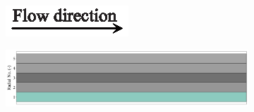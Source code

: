 \documentclass[preprint,12pt]{elsarticle}
\begin{document}
\begin{figure}[h!]
     \centering
     \begin{subfigure}[b]{\textwidth}
     	\includegraphics[width=\textwidth]{flow_dir.eps}
     \end{subfigure}
     \begin{subfigure}[b]{0.85\textwidth}
\includegraphics[width=\textwidth]{results/segments/5seg/50C50T/seg.png}
     \end{subfigure}
     \hfill
     \begin{subfigure}[b]{0.1\textwidth}

\end{subfigure}
\end{figure}
\end{document}
